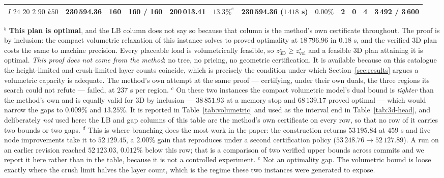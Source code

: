 \begin{table}[!htbp]
{\begin{tabular}{lrrlrrrrrrrr}
$I\_24\_20\_2\_90\_k50$ & 230\,594.36 & 160 & 160 / 160 & 200\,013.41 & $13.3\%^{e}$ & 230\,594.36 ($1\,418$ s) & $0.00\%$ & 2 & 0 & 4 & 3\,492 / 3\,600 \\
\bottomrule
\end{tabular}}
\begin{flushleft}\footnotesize
$^{b}$ \textbf{This plan is optimal}, and the LB column does not say so
because that column is the method's own certificate throughout. The
proof is by inclusion: the compact volumetric relaxation of this
instance solves to proved optimality at $18\,796.96$ in $0.18$ s, and
the verified 3D plan costs the same to machine precision. Every placeable load is volumetrically
feasible, so $z^{\star}_{\mathrm{3D}}\ge z^{\star}_{\mathrm{vol}}$ and a
feasible 3D plan attaining it is optimal. \emph{This proof does not come
from the method}: no tree, no pricing, no geometric certification. It is
available because on this catalogue the height-limited and crush-limited
layer counts coincide, which is precisely the condition under which
Section~\ref{sec:results} argues a volumetric capacity is adequate. The
method's own attempt at the same proof --- certifying, under their own
duals, the three regions its search could not refute --- failed, at
$237$ s per region.
$^{c}$ On these two instances the compact volumetric model's dual bound
is \emph{tighter} than the method's own and is equally valid for 3D by
inclusion --- $38\,851.93$ at a memory stop and $68\,139.17$ proved
optimal --- which would narrow the gaps to $0.009\%$ and $13.25\%$. It is
reported in Table~\ref{tab:volumetric} and used as the interval end in
Table~\ref{tab:3d-head}, and deliberately \emph{not} used here: the LB
and gap columns of this table are the method's own certificate on every
row, so that no row of it carries two bounds or two gaps.
$^{d}$ This is where branching does the most work in the paper: the
construction returns $53\,195.84$ at $459$ s and five node improvements
take it to $52\,129.45$, a $2.00\%$ gain that reproduces under a second
certification policy ($53\,248.76\rightarrow52\,127.89$). A run on an
earlier revision reached $52\,123.03$, $0.012\%$ below this row; that is
a comparison of two verified upper bounds across commits and we report it
here rather than in the table, because it is not a controlled
experiment.
$^{e}$ Not an optimality gap. The volumetric bound is loose exactly where
the crush limit halves the layer count, which is the regime these two
instances were generated to expose.
\end{flushleft}
\end{table}
